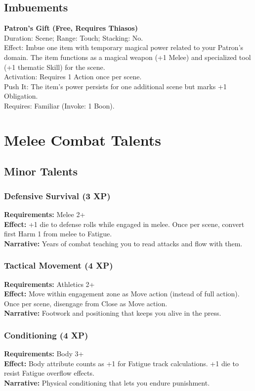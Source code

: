 \subsection{Imbuements}
\textbf{Patron’s Gift (Free, Requires Thiasos)}\\
Duration: Scene; Range: Touch; Stacking: No.\\
Effect: Imbue one item with temporary magical power related to your Patron’s domain. The item functions as a magical weapon (+1 Melee) and specialized tool (+1 thematic Skill) for the scene.\\
Activation: Requires 1 Action once per scene.\\
Push It: The item’s power persists for one additional scene but marks +1 Obligation.\\
Requires: Familiar (Invoke: 1 Boon).

\section{Melee Combat Talents}

\subsection{Minor Talents}

\subsubsection{Defensive Survival (3 XP)}
\textbf{Requirements:} Melee 2+ \\
\textbf{Effect:} +1 die to defense rolls while engaged in melee. Once per scene, convert first Harm 1 from melee to Fatigue. \\
\textbf{Narrative:} Years of combat teaching you to read attacks and flow with them.

\subsubsection{Tactical Movement (4 XP)}
\textbf{Requirements:} Athletics 2+ \\
\textbf{Effect:} Move within engagement zone as Move action (instead of full action). Once per scene, disengage from Close as Move action. \\
\textbf{Narrative:} Footwork and positioning that keeps you alive in the press.

\subsubsection{Conditioning (4 XP)}
\textbf{Requirements:} Body 3+ \\
\textbf{Effect:} Body attribute counts as +1 for Fatigue track calculations. +1 die to resist Fatigue overflow effects. \\
\textbf{Narrative:} Physical conditioning that lets you endure punishment.


